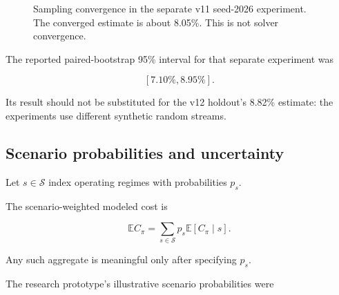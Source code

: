 \documentclass[10pt,a4paper]{article}
\newcommand{\EE}{\mathbb{E}}
\theoremstyle{plain}
\theoremstyle{definition}
\theoremstyle{remark}
\begin{document}
\begin{figure}[!htbp]
\centering


\caption{
Sampling convergence in the separate
v11 seed-2026 experiment.
The converged estimate is about 8.05\%.
This is not solver convergence.
}
\label{fig:convergence}
\end{figure}

The reported paired-bootstrap 95\% interval
for that separate experiment was

\[
[7.10\%,8.95\%].
\]

Its result should not be substituted
for the v12 holdout's
8.82\% estimate:
the experiments use different
synthetic random streams.

\subsection{Scenario probabilities and uncertainty}

Let \(s\in\mathcal S\)
index operating regimes
with probabilities \(p_s\).

The scenario-weighted modeled cost is

\begin{equation}
\EE C_\pi
=
\sum_{s\in\mathcal S}
p_s\EE[C_\pi\mid s].
\label{eq:scenario-mix}
\end{equation}

Any such aggregate is meaningful
only after specifying \(p_s\).

The research prototype's illustrative
scenario probabilities were
\end{document}

